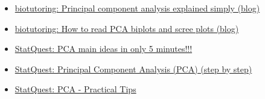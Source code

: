 \documentclass[12pt, titlepage, french]{report}
\begin{document}
\begin{YTB_vids}
\begin{itemize}
	\item	\href{https://blog.bioturing.com/2018/06/14/principal-component-analysis-explained-simply/}{biotutoring: Principal component analysis explained simply (blog)}
	\item	\href{https://blog.bioturing.com/2018/06/18/how-to-read-pca-biplots-and-scree-plots/}{biotutoring: How to read PCA biplots and scree plots (blog)}
	\item	\href{https://www.youtube.com/watch?v=HMOI_lkzW08&list=PLblh5JKOoLUICTaGLRoHQDuF_7q2GfuJF&index=23}{StatQuest: PCA main ideas in only 5 minutes!!!}
	\item	\href{https://www.youtube.com/watch?v=FgakZw6K1QQ}{StatQuest: Principal Component Analysis (PCA) (step by step)}
	\item	\href{https://www.youtube.com/watch?v=oRvgq966yZg&list=PLblh5JKOoLUICTaGLRoHQDuF_7q2GfuJF&index=24}{StatQuest: PCA - Practical Tips}
\end{itemize}
\end{YTB_vids}
\end{document}

